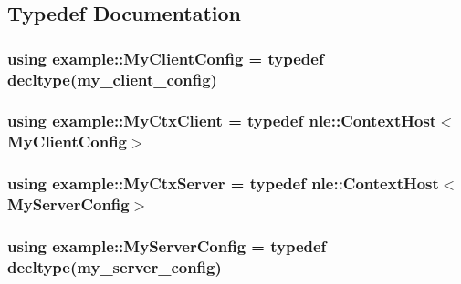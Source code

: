 \subsection{Typedef Documentation}
\hypertarget{namespaceexample_a1d0fadf5159e96dd9c1f2c1d645ed430}{}
\subsubsection[{My\+Client\+Config}]{\setlength{\rightskip}{0pt plus 5cm}using {\bf example\+::\+My\+Client\+Config} = typedef decltype({\bf my\+\_\+client\+\_\+config})}\label{namespaceexample_a1d0fadf5159e96dd9c1f2c1d645ed430}
\hypertarget{namespaceexample_a15f26e1f0bedfa575b4f5832a2b679b5}{}
\subsubsection[{My\+Ctx\+Client}]{\setlength{\rightskip}{0pt plus 5cm}using {\bf example\+::\+My\+Ctx\+Client} = typedef {\bf nle\+::\+Context\+Host}$<${\bf My\+Client\+Config}$>$}\label{namespaceexample_a15f26e1f0bedfa575b4f5832a2b679b5}
\hypertarget{namespaceexample_a691724c505d8b776cc3d6e6ecdd86c30}{}
\subsubsection[{My\+Ctx\+Server}]{\setlength{\rightskip}{0pt plus 5cm}using {\bf example\+::\+My\+Ctx\+Server} = typedef {\bf nle\+::\+Context\+Host}$<${\bf My\+Server\+Config}$>$}\label{namespaceexample_a691724c505d8b776cc3d6e6ecdd86c30}
\hypertarget{namespaceexample_af793395d62fc2b1e6ffb8fa73d751c26}{}
\subsubsection[{My\+Server\+Config}]{\setlength{\rightskip}{0pt plus 5cm}using {\bf example\+::\+My\+Server\+Config} = typedef decltype({\bf my\+\_\+server\+\_\+config})}\label{namespaceexample_af793395d62fc2b1e6ffb8fa73d751c26}
\hypertarget{namespaceexample_a5efa1dbb95bf11993a49738e533e7d0a}{}

